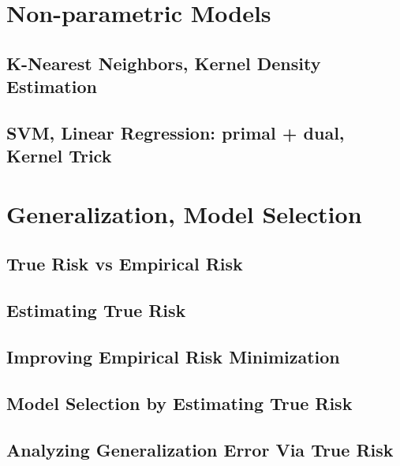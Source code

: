 \documentclass{article}
\begin{document}
\section{Non-parametric Models}
\subsection{K-Nearest Neighbors, Kernel Density Estimation}
\subsection{SVM, Linear Regression: primal + dual, Kernel Trick}





\section{Generalization, Model Selection}
\subsection{True Risk vs Empirical Risk}
\subsection{Estimating True Risk}
\subsection{Improving Empirical Risk Minimization}
\subsection{Model Selection by Estimating True Risk}
\subsection{Analyzing Generalization Error Via True Risk}
\end{document}
